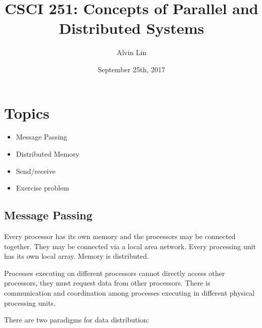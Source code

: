 \documentclass{math}
\title{CSCI 251: Concepts of Parallel and Distributed Systems}
\author{Alvin Lin}
\date{September 25th, 2017}
\begin{document}
\maketitle

\section*{Topics}
\begin{itemize}
  \item Message Passing
  \item Distributed Memory
  \item Send/receive
  \item Exercise problem
\end{itemize}

\subsection*{Message Passing}
Every processor has its own memory and the processors may be connected
together. They may be connected via a local area network. Every processing unit
has its own local array. Memory is distributed.
\begin{center}
\end{center}
Processes executing on different processors cannot directly access other
processors, they must request data from other processors. There is
communication and coordination among processes executing in different physical
processing units.
\begin{center}
\end{center}
There are two paradigms for data distribution:
\end{document}
